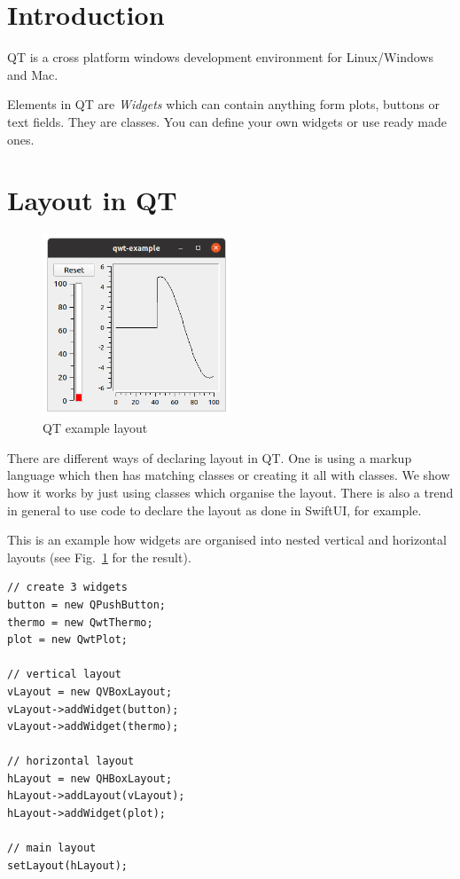 \documentclass[12pt]{report}
\begin{document}
\section{Introduction}
QT is a cross platform windows development environment
for Linux/Windows and Mac.

Elements in QT are \textsl{Widgets} which can contain
anything form plots, buttons or text fields. They are
classes. You can define your own widgets or use ready made ones.

\section{Layout in QT}

\begin{figure}[!hbt]
\begin{center}
\mbox{\includegraphics[width=0.5\textwidth]{qwtex}}
\end{center}
\caption{QT example layout
\label{qwtex}}
\end{figure}

There are different ways of declaring layout in QT. One is
using a markup language which then has matching classes
or creating it all with classes. We show how it works by
just using classes which organise the layout. There is
also a trend in general to use code to declare the layout
as done in SwiftUI, for example.

This is an example how widgets are organised into
nested vertical and horizontal layouts (see Fig.~\ref{qwtex}
for the result).
\begin{verbatim}
// create 3 widgets
button = new QPushButton;
thermo = new QwtThermo; 
plot = new QwtPlot;

// vertical layout
vLayout = new QVBoxLayout;
vLayout->addWidget(button);
vLayout->addWidget(thermo);

// horizontal layout
hLayout = new QHBoxLayout;
hLayout->addLayout(vLayout);
hLayout->addWidget(plot);

// main layout
setLayout(hLayout);
\end{verbatim}
\end{document}
